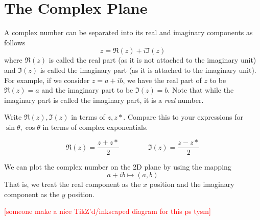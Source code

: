 \section{The Complex Plane}
A complex number can be separated into its real and imaginary components as follows
\begin{equation}
	z = \Re(z) + i\Im(z)
\end{equation}
where \(\Re(z)\) is called the real part (as it is not attached to the imaginary unit) and \(\Im(z)\) is called the imaginary part (as it is attached to the imaginary unit). For example, if we consider \(z = a+ib\), we have the real part of \(z\) to be \(\Re(z)=a\) and the imaginary part to be \(\Im(z) = b\). Note that while the imaginary part is called the imaginary part, it is a \emph{real} number. 
\begin{exercise}
	Write \(\Re(z), \Im(z)\) in terms of \(z,z\ast\). Compare this to your expressions for \(\sin\theta,\cos\theta\) in terms of complex exponentials.
\begin{solution}
	\[\Re(z) = \frac{z+z\ast}{2}\qquad\qquad \Im(z) = \frac{z-z\ast}{2}\]
\end{solution}
\end{exercise}

We can plot the complex number on the 2D plane by using the mapping
\[a+ib \mapsto (a,b)\]
That is, we treat the real component as the \(x\) position and the imaginary component as the \(y\) position.

\begin{center}\textcolor{red}{[someone make a nice TikZ'd/inkscaped diagram for this ps tysm]}\end{center}

